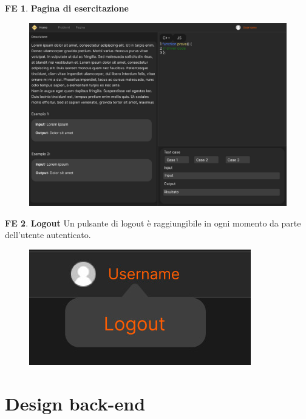 \documentclass[11pt, a4paper]{article}
\theoremstyle{definition}
\newtheorem{backend}{BE}
\newtheorem{frontend}{FE}
\begin{document}
\begin{frontend}
\textbf{Pagina di esercitazione }
\end{frontend}
\begin{figure}[H]
\centering
\includegraphics[scale=0.25]{./immaginife/esercitazione.jpeg}
\end{figure}

\newpage
\begin{frontend}
\textbf{Logout }
Un pulsante di logout è raggiungibile in ogni momento da parte dell'utente
autenticato.
\end{frontend}
\begin{figure}[H]
\centering
\includegraphics[scale=0.3]{./immaginife/logout.jpeg}
\end{figure}



\newpage
\section{Design back-end}

\end{document}
